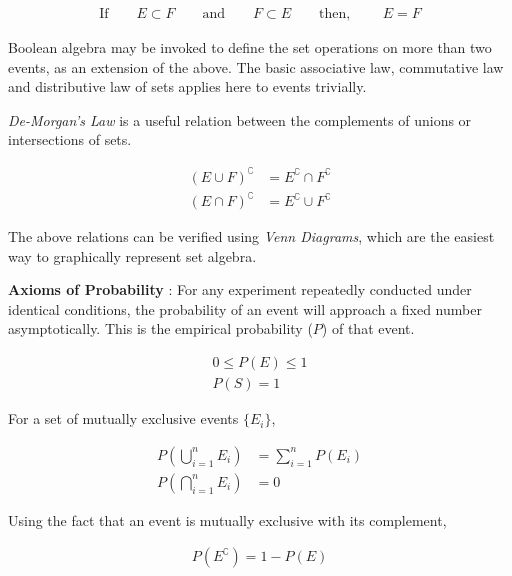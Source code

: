 \begin{align}
	\text{If} \qquad E \subset F \qquad \text{and} \qquad F \subset E \qquad \text{then, } \qquad E = F
\end{align}

Boolean algebra may be invoked to define the set operations on more than two events, as an extension of the above. The basic associative law, commutative law and distributive law of sets applies here to events trivially.

\textit{De-Morgan's Law} is a useful relation between the complements of unions or intersections of sets. 

\begin{align}
	(E \cup F)^{\complement} &= E^\complement \cap F^\complement \\
	(E \cap F)^{\complement} &= E^\complement \cup F^\complement 
\end{align}

The above relations can be verified using \textit{Venn Diagrams}, which are the easiest way to graphically represent set algebra.

\textbf{Axioms of Probability} : For any experiment repeatedly conducted under identical conditions, the probability of an event will approach a fixed number asymptotically. This is the empirical probability ($ P $) of that event.

\begin{align}
	0 \leq P(E) \leq 1 \\
	P(S) = 1 
\end{align}

For a set of mutually exclusive events $ \{ E_i \} $, 

\begin{align}
	P \left( \bigcup_{i = 1}^{n} E_i \right) &= \sum\limits_{i = 1}^{n} P(E_i) \\
	P \left( \bigcap_{i = 1}^{n} E_i \right) &= 0
\end{align}

Using the fact that an event is mutually exclusive with its complement, 

\begin{align}
	P(E^\complement) = 1 - P(E)
\end{align}

